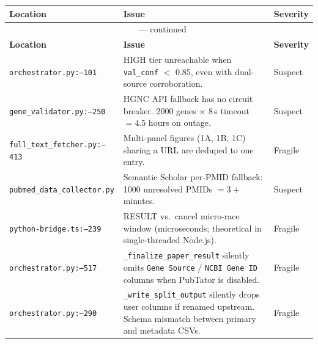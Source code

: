 \documentclass[11pt,a4paper]{article}
\begin{document}
\begin{longtable}{p{}p{}p{}}
\toprule
\textbf{Location} & \textbf{Issue} & \textbf{Severity} \\
\midrule
\endfirsthead
\multicolumn{3}{c}{{\tablename\ \thetable{} --- continued}} \\
\toprule \textbf{Location} & \textbf{Issue} & \textbf{Severity} \\
\midrule
\endhead
\bottomrule
\endlastfoot

\rowcolor{LightAmber}
\texttt{orchestrator.py:\linebreak 79--101} &
  HIGH tier unreachable when \texttt{val\_conf} $<$ 0.85, even with dual-source corroboration. &
  Suspect \\

\rowcolor{LightAmber}
\texttt{gene\_validator.py:\linebreak 216--250} &
  HGNC API fallback has no circuit breaker. 2000 genes $\times$ 8\,s timeout $= 4.5$ hours on outage. &
  Suspect \\

\rowcolor{LightAmber}
\texttt{full\_text\_fetcher.py:\linebreak 354--413} &
  Multi-panel figures (1A, 1B, 1C) sharing a URL are deduped to one entry. &
  Fragile \\

\rowcolor{LightAmber}
\texttt{pubmed\_data\_\linebreak collector.py} &
  Semantic Scholar per-PMID fallback: 1000 unresolved PMIDs $= 3+$ minutes. &
  Suspect \\

\rowcolor{LightAmber}
\texttt{python-bridge.ts:\linebreak 234--239} &
  RESULT vs.\ cancel micro-race window (microseconds; theoretical in single-threaded Node.js). &
  Fragile \\

\rowcolor{LightGray}
\texttt{orchestrator.py:\linebreak 409--517} &
  \texttt{\_finalize\_paper\_result} silently omits \texttt{Gene Source} / \texttt{NCBI Gene ID} columns when PubTator is disabled. &
  Fragile \\

\rowcolor{LightGray}
\texttt{orchestrator.py:\linebreak 217--290} &
  \texttt{\_write\_split\_output} silently drops user columns if renamed upstream. Schema mismatch between primary and metadata CSVs. &
  Fragile \\

\end{longtable}
\end{document}
